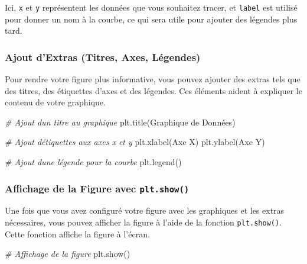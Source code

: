 \documentclass[11pt]{article}
\newenvironment{Shaded}{}{}
\newcommand{\StringTok}[1]{\textcolor[rgb]{0.25,0.44,0.63}{{#1}}}
\newcommand{\CommentTok}[1]{\textcolor[rgb]{0.38,0.63,0.69}{\textit{{#1}}}}
\newcommand{\NormalTok}[1]{{#1}}
\begin{document}
Ici, \texttt{x} et \texttt{y} représentent les données que vous
souhaitez tracer, et \texttt{label} est utilisé pour donner un nom à la
courbe, ce qui sera utile pour ajouter des légendes plus tard.

\hypertarget{ajout-dextras-titres-axes-luxe9gendes}{%
\subsubsection{Ajout d'Extras (Titres, Axes,
Légendes)}\label{ajout-dextras-titres-axes-luxe9gendes}}

Pour rendre votre figure plus informative, vous pouvez ajouter des
extras tels que des titres, des étiquettes d'axes et des légendes. Ces
éléments aident à expliquer le contenu de votre graphique.

\begin{Shaded}
\begin{Highlighting}[]
\CommentTok{\# Ajout d\textquotesingle{}un titre au graphique}
\NormalTok{plt.title(}\StringTok{\textquotesingle{}Graphique de Données\textquotesingle{}}\NormalTok{)}

\CommentTok{\# Ajout d\textquotesingle{}étiquettes aux axes x et y}
\NormalTok{plt.xlabel(}\StringTok{\textquotesingle{}Axe X\textquotesingle{}}\NormalTok{)}
\NormalTok{plt.ylabel(}\StringTok{\textquotesingle{}Axe Y\textquotesingle{}}\NormalTok{)}

\CommentTok{\# Ajout d\textquotesingle{}une légende pour la courbe}
\NormalTok{plt.legend()}
\end{Highlighting}
\end{Shaded}

\hypertarget{affichage-de-la-figure-avec-plt.show}{%
\subsubsection{\texorpdfstring{\textbf{Affichage de la Figure avec
\texttt{plt.show()}}}{Affichage de la Figure avec plt.show()}}\label{affichage-de-la-figure-avec-plt.show}}

Une fois que vous avez configuré votre figure avec les graphiques et les
extras nécessaires, vous pouvez afficher la figure à l'aide de la
fonction \texttt{plt.show()}. Cette fonction affiche la figure à
l'écran.

\begin{Shaded}
\begin{Highlighting}[]
\CommentTok{\# Affichage de la figure}
\NormalTok{plt.show()}
\end{Highlighting}
\end{Shaded}
\end{document}

